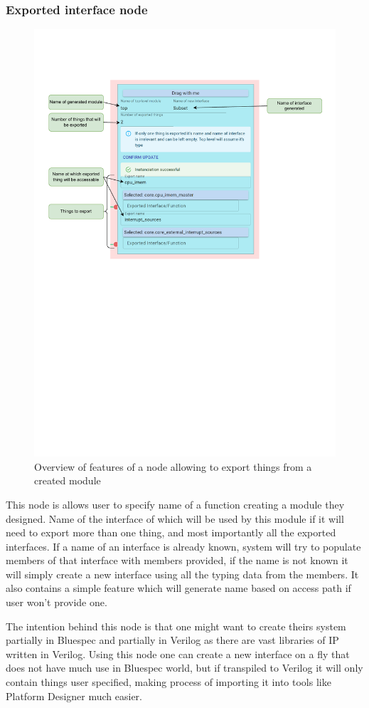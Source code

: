 \documentclass[12pt]{report}
\begin{document}
\subsubsection{Exported interface node}
\begin{figure}[h!]
    \centering
    
    \includegraphics[width=0.8\columnwidth]{pdfExports/LargeMap-ExportNode.drawio.pdf}
    \caption{Overview of features of a node allowing to export things from a created module}
\end{figure}
This node is allows user to specify name of a function creating a module they designed. Name of the interface of which will be used by this module if it will need to export more than one thing, and most importantly all the exported interfaces. If a name of an interface is already known, system will try to populate members of that interface with members provided, if the name is not known it will simply create a new interface using all the typing data from the members. It also contains a simple feature which will generate name based on access path if user won't provide one. 
\par
The intention behind this node is that one might want to create theirs system partially in Bluespec and partially in Verilog as there are vast libraries of IP written in Verilog. Using this node one can create a new interface on a fly that does not have much use in Bluespec world, but if transpiled to Verilog it will only contain things user specified, making process of importing it into tools like Platform Designer much easier. 
\end{document}
